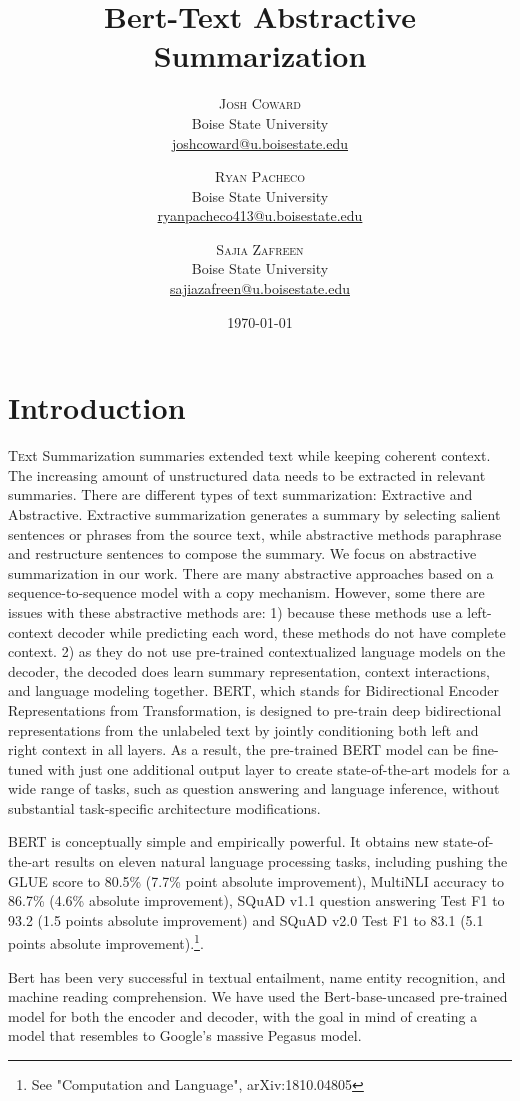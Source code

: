 \documentclass[twoside,twocolumn]{article}
\title{Bert-Text Abstractive Summarization} %
\author{%
\textsc{Josh Coward}\\[1ex] %
\normalsize Boise State University \\ %
\normalsize \href{mailto:joshcoward@u.boisestate.edu}{joshcoward@u.boisestate.edu} %
\and %
\textsc{Ryan Pacheco}\\[1ex] %
\normalsize Boise State University \\ %
\normalsize \href{mailto:ryanpacheco413@u.boisestate.edu}{ryanpacheco413@u.boisestate.edu} %
\and %
\textsc{Sajia Zafreen}\\[1ex] %
\normalsize Boise State University \\ %
\normalsize \href{mailto:sajiazafreen@u.boisestate.edu}{sajiazafreen@u.boisestate.edu} %
}
\date{\today} %
\begin{document}
\maketitle



\section{Introduction}
\lettrine[nindent=0em,lines=3]

Text Summarization summaries extended text while keeping coherent context. The increasing amount of unstructured data needs to be 
extracted in relevant summaries. There are different types of text summarization: Extractive and Abstractive. Extractive summarization 
generates a summary by selecting salient sentences or phrases from the source text, while abstractive methods paraphrase and restructure 
sentences to compose the summary. We focus on abstractive summarization in our work. There are many abstractive approaches based on a 
sequence-to-sequence model with a copy mechanism. However, some there are issues with these abstractive methods are: 1) because these 
methods use a left-context decoder while predicting each word, these methods do not have complete context. 2) as they do not use 
pre-trained contextualized language models on the decoder, the decoded does learn summary representation, context interactions, 
and language modeling together. 
BERT, which stands for Bidirectional Encoder Representations from Transformation, is designed to pre-train deep bidirectional representations 
from the unlabeled text by jointly conditioning both left and right context in all layers. As a result, the pre-trained BERT model can be 
fine-tuned with just one additional output layer to create state-of-the-art models for a wide range of tasks, such as question answering 
and language inference, without substantial task-specific architecture modifications.\par
BERT is conceptually simple and empirically powerful. It obtains new state-of-the-art results on eleven natural language processing tasks, 
including pushing the GLUE score to 80.5\% (7.7\% point absolute improvement), MultiNLI accuracy to 86.7\% (4.6\% absolute improvement), 
SQuAD v1.1 question answering Test F1 to 93.2 (1.5 points absolute improvement) and SQuAD v2.0 Test F1 to 83.1 (5.1 points absolute 
improvement).\footnote{See "Computation and Language", arXiv:1810.04805 }. \par
Bert has been very successful in textual entailment, name entity recognition, and machine reading comprehension. We have used the 
Bert-base-uncased pre-trained model for both the encoder and decoder, with the goal in mind of creating a model that resembles to Google's 
massive Pegasus model.
\end{document}
